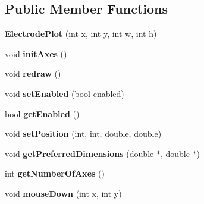 \subsection*{Public Member Functions}
\begin{DoxyCompactItemize}
\item 
\hypertarget{classElectrodePlot_a38ca347b89d0a8388e3b8874a9c8291d}{{\bfseries Electrode\-Plot} (int x, int y, int w, int h)}\label{classElectrodePlot_a38ca347b89d0a8388e3b8874a9c8291d}

\item 
\hypertarget{classElectrodePlot_ab222ba4b5332926e5548770a90b72c37}{void {\bfseries init\-Axes} ()}\label{classElectrodePlot_ab222ba4b5332926e5548770a90b72c37}

\item 
\hypertarget{classElectrodePlot_a6a135cde6e380524e7ee2eecfaa7b241}{void {\bfseries redraw} ()}\label{classElectrodePlot_a6a135cde6e380524e7ee2eecfaa7b241}

\item 
\hypertarget{classElectrodePlot_a4cbd5761bd66e3a278f7e0d0e917fb27}{void {\bfseries set\-Enabled} (bool enabled)}\label{classElectrodePlot_a4cbd5761bd66e3a278f7e0d0e917fb27}

\item 
\hypertarget{classElectrodePlot_a167ae69b1e5f45b57371aea91f53fa1b}{bool {\bfseries get\-Enabled} ()}\label{classElectrodePlot_a167ae69b1e5f45b57371aea91f53fa1b}

\item 
\hypertarget{classElectrodePlot_a619fae24731c9abd554067f22bd47641}{void {\bfseries set\-Position} (int, int, double, double)}\label{classElectrodePlot_a619fae24731c9abd554067f22bd47641}

\item 
\hypertarget{classElectrodePlot_a3cd86a9218c81d2217624851fed1c930}{void {\bfseries get\-Preferred\-Dimensions} (double $\ast$, double $\ast$)}\label{classElectrodePlot_a3cd86a9218c81d2217624851fed1c930}

\item 
\hypertarget{classElectrodePlot_a8d70b0e45c5915593deb19485d5ab541}{int {\bfseries get\-Number\-Of\-Axes} ()}\label{classElectrodePlot_a8d70b0e45c5915593deb19485d5ab541}

\item 
\hypertarget{classElectrodePlot_a560bceaa1b9d763bc36756ce5a00da82}{void {\bfseries mouse\-Down} (int x, int y)}\label{classElectrodePlot_a560bceaa1b9d763bc36756ce5a00da82}


\end{DoxyCompactItemize}
